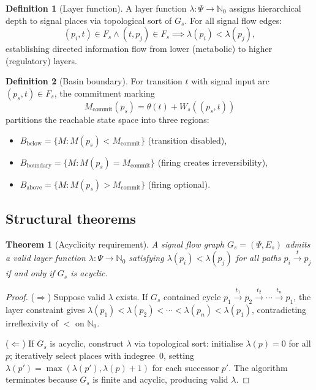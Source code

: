 \documentclass[11pt,a4paper]{article}
\theoremstyle{plain}
\newtheorem{theorem}{Theorem}
\theoremstyle{definition}
\newtheorem{definition}{Definition}
\begin{document}
\begin{definition}[Layer function]
A layer function $\lambda: \Psi \rightarrow \mathbb{N}_0$ assigns hierarchical depth to signal places via topological sort of $G_s$. For all signal flow edges:
\begin{equation}
(p_i,t) \in F_s \wedge (t,p_j) \in F_s \implies \lambda(p_i) < \lambda(p_j),
\end{equation}
establishing directed information flow from lower (metabolic) to higher (regulatory) layers.
\end{definition}

\begin{definition}[Basin boundary]
For transition $t$ with signal input arc $(p_s,t) \in F_s$, the commitment marking
\begin{equation}
M_{\mathrm{commit}}(p_s) = \theta(t) + W_s((p_s,t))
\end{equation}
partitions the reachable state space into three regions:
\begin{itemize}
\item $B_{\mathrm{below}} = \{M : M(p_s) < M_{\mathrm{commit}}\}$ (transition disabled),
\item $B_{\mathrm{boundary}} = \{M : M(p_s) = M_{\mathrm{commit}}\}$ (firing creates irreversibility),
\item $B_{\mathrm{above}} = \{M : M(p_s) > M_{\mathrm{commit}}\}$ (firing optional).
\end{itemize}
\end{definition}

\subsection{Structural theorems}

\begin{theorem}[Acyclicity requirement]\label{thm:acyclicity}
A signal flow graph $G_s = (\Psi, E_s)$ admits a valid layer function $\lambda: \Psi \rightarrow \mathbb{N}_0$ satisfying $\lambda(p_i) < \lambda(p_j)$ for all paths $p_i \xrightarrow{t} p_j$ if and only if $G_s$ is acyclic.
\end{theorem}

\begin{proof}
($\Rightarrow$) Suppose valid $\lambda$ exists. If $G_s$ contained cycle $p_1 \xrightarrow{t_1} p_2 \xrightarrow{t_2} \cdots \xrightarrow{t_n} p_1$, the layer constraint gives $\lambda(p_1) < \lambda(p_2) < \cdots < \lambda(p_n) < \lambda(p_1)$, contradicting irreflexivity of $<$ on $\mathbb{N}_0$.

($\Leftarrow$) If $G_s$ is acyclic, construct $\lambda$ via topological sort: initialise $\lambda(p) = 0$ for all $p$; iteratively select places with indegree~0, setting $\lambda(p') = \max(\lambda(p'), \lambda(p) + 1)$ for each successor $p'$. The algorithm terminates because $G_s$ is finite and acyclic, producing valid $\lambda$.
\end{proof}
\end{document}
